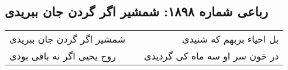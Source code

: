 \begin{center}
\section*{رباعی شماره ۱۸۹۸: شمشیر اگر گردن جان ببریدی}
\label{sec:1898}
\begin{longtable}{l p{0.5cm} r}
شمشیر اگر گردن جان ببریدی
&&
بل احیاء بربهم که شنیدی
\\
روح یحیی اگر نه باقی بودی
&&
در خون سر او سه ماه کی گردیدی
\\
\end{longtable}
\end{center}
